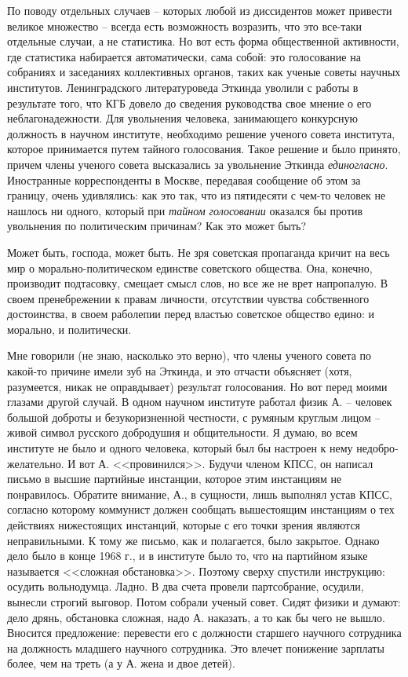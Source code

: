 \documentclass{book}
\begin{document}
По поводу отдельных случаев -- которых любой из диссидентов может привести великое множество -- всегда есть возможность возразить, что это все-таки отдельные случаи, а не статистика. Но вот есть форма общественной активности, где статистика набирается автоматически, сама собой: это голосование на собраниях и заседаниях коллективных органов, таких как ученые советы научных институтов. Ленинградского литературоведа Эткинда уволили с работы в результате того, что КГБ довело до сведения руководства свое мнение о его неблагонадежности. Для увольнения человека, занимающего конкурсную должность в научном институте, необходимо решение ученого совета института, которое принимается путем тайного голосования. Такое решение и было принято, причем члены ученого совета высказались за увольнение Эткинда \textit{единогласно}.  Иностранные корреспонденты в Москве, передавая сообщение об этом за границу, очень удивлялись: как это так, что из пятидесяти с чем-то человек не нашлось ни одного, кото­рый при \textit{тайном 
голосовании}  оказался бы против увольнения по политическим причинам? Как это может быть?

Может быть, господа, может быть. Не зря советская пропа­ганда кричит на весь мир о морально-политическом единстве советского общества. Она, конечно, производит подтасовку, смещает смысл слов, но все же не врет напропалую. В своем пренебрежении к правам личности, отсутствии чувства собст­венного достоинства, в своем раболепии перед властью совет­ское общество едино: и морально, и политически.

Мне говорили (не знаю, насколько это верно), что члены ученого совета по какой-то причине имели зуб на Эткинда, и это отчасти объясняет (хотя, разумеется, никак не оправды­вает) результат голосования. Но вот перед моими глазами другой случай. В одном научном институте работал физик А. -- человек большой доброты и безукоризненной честности, с ру­мяным круглым лицом -- живой символ русского доброду­шия и общительности. Я думаю, во всем институте не было и одного человека, который был бы настроен к нему недобро­желательно. И вот А. <<провинился>>. Будучи членом КПСС, он написал письмо в высшие партийные инстанции, которое этим инстанциям не понравилось. Обратите внимание, А., в сущ­ности, лишь выполнял устав КПСС, согласно которому комму­нист должен сообщать вышестоящим инстанциям о тех дейст­виях нижестоящих инстанций, которые с его точки зрения являются неправильными. К тому же письмо, как и полагает­ся, было закрытое. Однако дело было в конце 1968 г., и в институте было то, что на партийном языке называется 
<<слож­ная обстановка>>. Поэтому сверху спустили инструкцию: осу­дить вольнодумца. Ладно. В два счета провели партсобрание, осудили, вынесли строгий выговор. Потом собрали ученый со­вет. Сидят физики и думают: дело дрянь, обстановка сложная, надо А. наказать, а то как бы чего не вышло. Вносится предло­жение: перевести его с должности старшего научного сотруд­ника на должность младшего научного сотрудника. Это вле­чет понижение зарплаты более, чем на треть (а у А. жена и двое детей).
\end{document}
